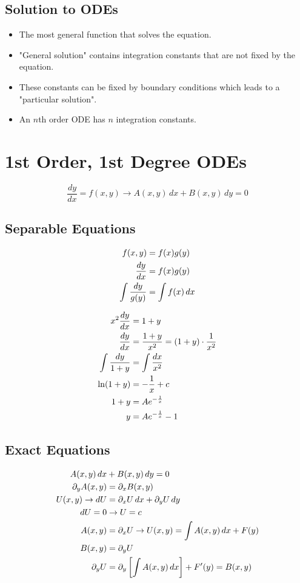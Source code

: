 \documentclass[Maths.tex]{subfiles}
\begin{document}
\subsection{Solution to ODEs}
\begin{itemize}
    \item The most general function that solves the equation.
    \item "General solution" contains integration constants that are not fixed by the equation.
    \item These constants can be fixed by boundary conditions which leads to a "particular solution".
    \item An $n$th order ODE has $n$ integration constants.
\end{itemize}

\section{1st Order, 1st Degree ODEs}
\begin{equation*}
    \frac{dy}{dx} = f(x,y) \to A(x,y)\,dx + B(x,y)\,dy = 0
\end{equation*}

\subsection{Separable Equations}
\begin{align*}
    f(x,y) &= f(x)g(y) \\
    \frac{dy}{dx} &= f(x)g(y) \\
    \int \frac{dy}{g(y)} &= \int f(x)\,dx
\end{align*}

\begin{example}
    \begin{align*}
        x^2 \frac{dy}{dx} &= 1 + y \\
        \frac{dy}{dx} &= \frac{1 + y}{x^2} = (1 + y) \cdot \frac{1}{x^2} \\
        \int \frac{dy}{1 + y} &= \int \frac{dx}{x^2} \\
        \ln(1 + y) &= -\frac{1}{x} + c \\
        1 + y &= Ae^{-\frac{1}{x}} \\
        y &= Ae^{-\frac{1}{x}} - 1
    \end{align*}
\end{example}

\subsection{Exact Equations}
\begin{align*}
    A(x,y)\,dx &+ B(x,y)\,dy = 0 \\
    \partial_yA(x,y) &= \partial_xB(x,y) \\
    U(x,y) \to dU &= \partial_xU\,dx + \partial_yU\,dy \\
    dU = 0 &\to U = c \\
    A(x,y) &= \partial_xU \to U(x,y) = \int A(x,y)\,dx + F(y) \\
    B(x,y) &= \partial_yU  \\
    \partial_yU &= \partial_y \left[\int A(x,y)\,dx \right] + F'(y) = B(x,y)
\end{align*}
\end{document}
